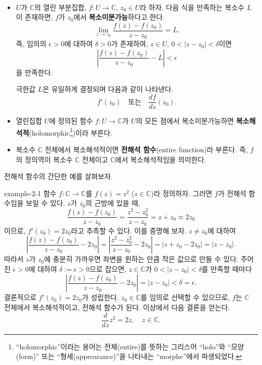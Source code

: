 \

\begin{saltdefinition} {}{}\label{def-2-1}

\begin{itemize}
\item[(1)] $U$가 $\mathbb C$의 열린 부분집합, $f: U\to \mathbb C$, $z_0\in U$라 하자.
다음 식을 만족하는 복소수 $L$이 존재하면, $f$가 $z_0$에서 {\bf 복소미분가능}하다고 한다.
\[
\lim_{z\to z_0} \dfrac{f(z) - f(z_0)}{z - z_0} = L.
\]
즉, 임의의 $\epsilon>0$에 대하여 $\delta>0$가 존재하여,
$z\in U$, $0<|z-z_0|<\delta$이면 
\[
\left| \dfrac{f(z) - f(z_0)}{z - z_0} - L\right| < \epsilon
\]
을 만족한다.

극한값  $L$은 유일하게 결정되며 다음과 같이 나타낸다.
\[
f'(z_0) \quad\text{또는}\quad \dfrac{df}{dz}(z_0).
\]

\item[(2)] 열린집합 $U$에 정의된 함수 $f:U\to\mathbb C$가 $U$의 모든 점에서
복소미분가능하면 \textbf{복소해석적}(holomorphic\footnote{
``holomorphic''이라는 용어는 전체(entire)를 뜻하는 그리스어 ``holo''와
``모양(form)'' 또는 ``형세(apprearance)''을 나타내는 ``morphe''에서 파생되었다.
})이라 부른다.
\item[(3)] 복소수 $\mathbb C$ 전체에서 복소해석적이면 
\textbf{전해석 함수}(entire function)라 부른다. 즉, $f$의 정의역이 복소수 $\mathbb C$ 전체이고
$\mathbb C$에서 복소해석적임을 의미한다.
\end{itemize}
\end{saltdefinition}

전해석 함수의 간단한 예를 살펴보자.

\begin{saltexample}[label=example-2-1]{}{example-2-1} 
함수 $f:\mathbb C \to \mathbb C$를 $f(z) = z^2$ ($z\in\mathbb C$)라 정의하자.
그러면 $f$가 전해석 함수임을 보일 수 있다.
$z$가 $z_0$의 근방에 있을 때,
\[
\dfrac{f(z) - f(z_0)}{z - z_0} = \dfrac{z^2 - z_0^2}{z-z_0} = z + z_0 
\approx 2z_0
\]
이므로, $f'(z_0) = 2z_0$라고 추측할 수 있다.
이를 증명해 보자.
$z\ne z_0$에 대하여
\[
\left| \dfrac{f(z) - f(z_0)}{z - z_0} - 2z_0 \right|
= \left| \dfrac{z^2 - z_0^2}{z-z_0} - 2z_0 \right| 
= |z+z_0-2z_0| = |z-z_0|.
\]
따라서 $z$가 $z_0$에 충분히 가까우면
좌변을 원하는 만큼 작은 값으로 만들 수 있다.
주어진 $\epsilon>0$에 대하여
$\delta:=\epsilon>0$으로 잡으면,
$z\in\mathbb C$가 $0<|z-z_0| <\delta$를 만족할 때마다
\[
\left| \dfrac{f(z) - f(z_0)}{z - z_0} - 2z_0 \right|
= |z-z_0| <\delta = \epsilon.
\]
결론적으로 $f'(z_0) = 2z_0$가 성립한다.
$z_0\in\mathbb C$를 임의로 선택할 수 있으므로,
$f$는 $\mathbb C$ 전체에서 복소해석적이고,
전해석 함수가 된다. 이상에서 다음 결론을 얻는다.
\[
\dfrac{d}{dz} z^2 = 2z, \quad z\in \mathbb C.
\]
\end{saltexample}

